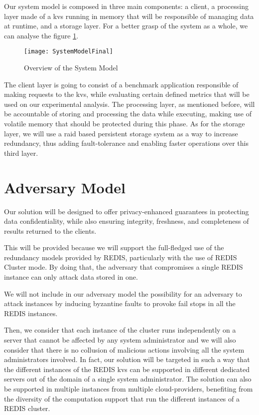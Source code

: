 Our system model is composed in three main components: a client, a processing layer made of a \gls{kvs} running in memory that will be responsible of managing data at runtime, and a storage layer. For a better grasp of the system as a whole, we can analyse the figure \ref{fig:systemModel}.

\begin{figure}[htbp]
	\centering
	{\texttt{[image: SystemModelFinal]}}
	\caption{Overview of the System Model}
	\label{fig:systemModel}
\end{figure}

The client layer is going to consist of a benchmark application responsible of making requests to the \gls{kvs}, while evaluating certain defined metrics that will be used on our experimental analysis. The processing layer, as mentioned before, will be accountable of storing and processing the data while executing, making use of volatile memory that should be protected during this phase. As for the storage layer, we will use a \gls{raid} based persistent storage system as a way to increase redundancy, thus adding fault-tolerance and enabling faster operations over this third layer.





\section{Adversary Model} %
\label{sec:inserting_tables}


Our solution will be designed to offer privacy-enhanced guarantees in protecting data confidentiality, while also ensuring integrity, freshness, and completeness of results returned to the clients. 

This will be provided because we will support the full-fledged use of the redundancy models provided by REDIS, particularly with the use of REDIS Cluster mode. By doing that, the adversary that compromises a single REDIS instance can only attack data stored in one. 

We will not include in our adversary model the possibility for an adversary to attack instances by inducing byzantine faults to provoke fail stops in all the REDIS instances. 

Then, we consider that each instance of the cluster runs independently on a server that cannot be affected by any system administrator and we will also consider that there is no collusion of malicious actions involving all the system administrators involved. In fact, our solution will be targeted in such a way that the different instances of the REDIS \gls{kvs} can be supported in different dedicated servers out of the domain of a single system administrator. The solution can also be supported in multiple instances from multiple cloud-providers, benefiting from the diversity of the computation support that run the different instances of a REDIS cluster.



